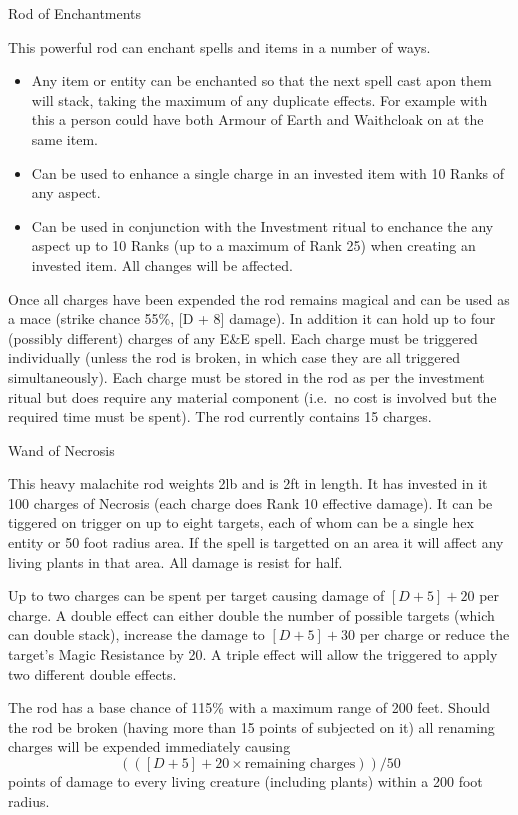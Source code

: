 \documentclass[a4paper]{article}
\begin{document}
\begin{ep-box}{Rod of Enchantments}

This powerful rod can enchant spells and items in a number of ways.
\begin{itemize}

\item
Any item or entity can be enchanted so that the next spell cast apon
them will stack, taking the maximum of any duplicate effects.  For
example with this a person could have both Armour of Earth and
Waithcloak on at the same item.

\item
Can be used to enhance a single charge in an invested item with 10
Ranks of any aspect.

\item
Can be used in conjunction with the Investment ritual to enchance the
any aspect up to 10 Ranks (up to a maximum of Rank 25) when creating
an invested item.  All changes will be affected.

\end{itemize}

Once all charges have been expended the rod remains magical and can be
used as a mace (strike chance 55\%, [D + 8] damage).  In addition it
can hold up to four (possibly different) charges of any E\&E spell.
Each charge must be triggered individually (unless the rod is broken,
in which case they are all triggered simultaneously).  Each charge
must be stored in the rod as per the investment ritual but does
require any material component (i.e.\ no cost is involved but the
required time must be spent).  The rod currently contains 15 charges.
\end{ep-box}

\begin{ep-box}{Wand of Necrosis}

This heavy malachite rod weights 2lb and is 2ft in length.  It has
invested in it 100 charges of Necrosis (each charge does Rank 10
effective damage). It can be tiggered on trigger on up to eight
targets, each of whom can be a single hex entity or 50 foot radius
area.  If the spell is targetted on an area it will affect any living
plants in that area.  All damage is resist for half.

Up to two charges can be spent per target causing damage of $[D + 5] +
20$ per charge.  A double effect can either double the number of
possible targets (which can double stack), increase the damage to $[D
+ 5] + 30$ per charge or reduce the target's Magic Resistance by 20.
A triple effect will allow the triggered to apply two different double
effects.

The rod has a base chance of 115\% with a maximum range of 200 feet.
Should the rod be broken (having more than 15 points of subjected on
it) all renaming charges will be expended immediately causing $$(([D +
5] + 20 \times \mbox{remaining charges})) / 50$$ points of damage to
every living creature (including plants) within a 200 foot radius.
\end{ep-box}
\end{document}
